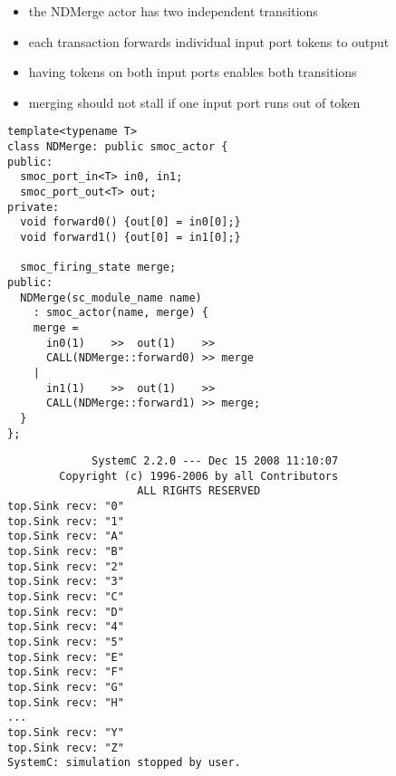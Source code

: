 \begin{frame}
\begin{figure}
\centering
\resizebox{0.9\columnwidth}{!}{}
\end{figure}
\begin{itemize}
\item the NDMerge actor has two independent transitions
\item each transaction forwards individual input port tokens to output
\item having tokens on both input ports enables both transitions
\item merging should not stall if one input port runs out of token
\end{itemize}
\end{frame}





\begin{frame}[fragile=singleslide]
\begin{lstlisting}
template<typename T>
class NDMerge: public smoc_actor {
public:
  smoc_port_in<T> in0, in1;
  smoc_port_out<T> out;
private:
  void forward0() {out[0] = in0[0];}
  void forward1() {out[0] = in1[0];}

  smoc_firing_state merge;
public:
  NDMerge(sc_module_name name)
    : smoc_actor(name, merge) {
    merge =
      in0(1)    >>  out(1)    >>
      CALL(NDMerge::forward0) >> merge
    |
      in1(1)    >>  out(1)    >>
      CALL(NDMerge::forward1) >> merge;
  }
};
\end{lstlisting}
\end{frame}





\begin{frame}[fragile=singleslide]
\begin{lstlisting}
             SystemC 2.2.0 --- Dec 15 2008 11:10:07
        Copyright (c) 1996-2006 by all Contributors
                    ALL RIGHTS RESERVED
top.Sink recv: "0"
top.Sink recv: "1"
top.Sink recv: "A"
top.Sink recv: "B"
top.Sink recv: "2"
top.Sink recv: "3"
top.Sink recv: "C"
top.Sink recv: "D"
top.Sink recv: "4"
top.Sink recv: "5"
top.Sink recv: "E"
top.Sink recv: "F"
top.Sink recv: "G"
top.Sink recv: "H"
...
top.Sink recv: "Y"
top.Sink recv: "Z"
SystemC: simulation stopped by user.
\end{lstlisting}
\end{frame}





